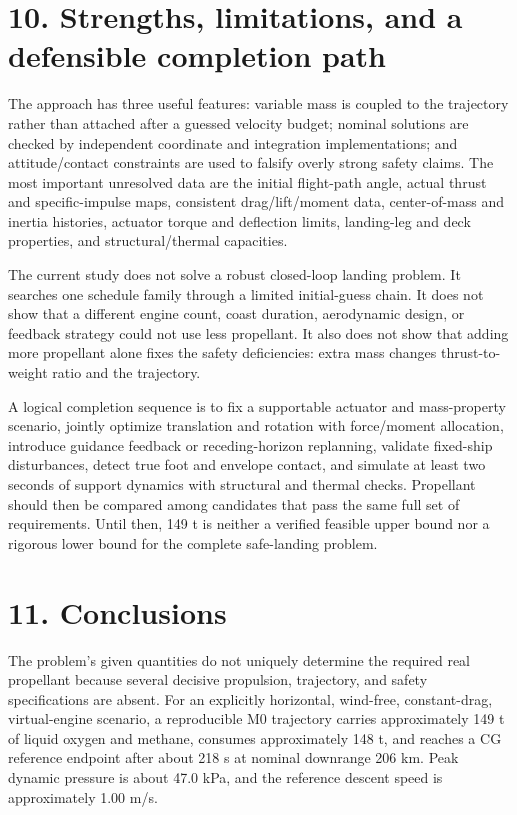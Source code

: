 \documentclass[
  11pt,
  a4paper,
]{article}
\begin{document}
\section{10. Strengths, limitations, and a defensible completion
path}\label{strengths-limitations-and-a-defensible-completion-path}

The approach has three useful features: variable mass is coupled to the
trajectory rather than attached after a guessed velocity budget; nominal
solutions are checked by independent coordinate and integration
implementations; and attitude/contact constraints are used to falsify
overly strong safety claims. The most important unresolved data are the
initial flight-path angle, actual thrust and specific-impulse maps,
consistent drag/lift/moment data, center-of-mass and inertia histories,
actuator torque and deflection limits, landing-leg and deck properties,
and structural/thermal capacities.

The current study does not solve a robust closed-loop landing problem.
It searches one schedule family through a limited initial-guess chain.
It does not show that a different engine count, coast duration,
aerodynamic design, or feedback strategy could not use less propellant.
It also does not show that adding more propellant alone fixes the safety
deficiencies: extra mass changes thrust-to-weight ratio and the
trajectory.

A logical completion sequence is to fix a supportable actuator and
mass-property scenario, jointly optimize translation and rotation with
force/moment allocation, introduce guidance feedback or receding-horizon
replanning, validate fixed-ship disturbances, detect true foot and
envelope contact, and simulate at least two seconds of support dynamics
with structural and thermal checks. Propellant should then be compared
among candidates that pass the same full set of requirements. Until
then, 149 t is neither a verified feasible upper bound nor a rigorous
lower bound for the complete safe-landing problem.

\section{11. Conclusions}\label{conclusions}

The problem's given quantities do not uniquely determine the required
real propellant because several decisive propulsion, trajectory, and
safety specifications are absent. For an explicitly horizontal,
wind-free, constant-drag, virtual-engine scenario, a reproducible M0
trajectory carries approximately 149 t of liquid oxygen and methane,
consumes approximately 148 t, and reaches a CG reference endpoint after
about 218 s at nominal downrange 206 km. Peak dynamic pressure is about
47.0 kPa, and the reference descent speed is approximately 1.00 m/s.
\end{document}
